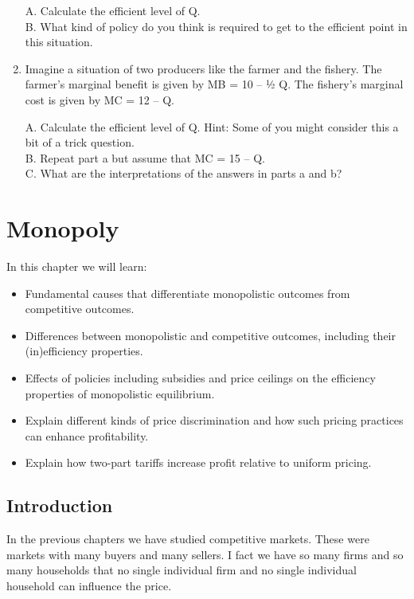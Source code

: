 \documentclass[
]{book}
\providecommand{\tightlist}{%
  \setlength{\itemsep}{0pt}\setlength{\parskip}{0pt}}
\begin{document}
\begin{enumerate}
  A. Calculate the efficient level of Q.\\
  B. What kind of policy do you think is required to get to the efficient point in this situation.
\item
  Imagine a situation of two producers like the farmer and the fishery. The farmer's marginal benefit is given by MB = 10 -- ½ Q. The fishery's marginal cost is given by MC = 12 -- Q.

  A. Calculate the efficient level of Q. Hint: Some of you might consider this a bit of a trick question.\\
  B. Repeat part a but assume that MC = 15 -- Q.\\
  C. What are the interpretations of the answers in parts a and b?
\end{enumerate}

\hypertarget{monopoly}{%
\chapter{Monopoly}\label{monopoly}}

In this chapter we will learn:

\begin{itemize}
\tightlist
\item
  Fundamental causes that differentiate monopolistic outcomes from competitive outcomes.
\item
  Differences between monopolistic and competitive outcomes, including their (in)efficiency properties.
\item
  Effects of policies including subsidies and price ceilings on the efficiency properties of monopolistic equilibrium.
\item
  Explain different kinds of price discrimination and how such pricing practices can enhance profitability.
\item
  Explain how two-part tariffs increase profit relative to uniform pricing.
\end{itemize}

\hypertarget{introduction}{%
\section{Introduction}\label{introduction}}

In the previous chapters we have studied competitive markets. These were markets with many buyers and many sellers. I fact we have so many firms and so many households that no single individual firm and no single individual household can influence the price.
\end{document}
